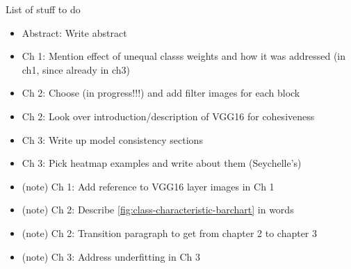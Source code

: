 
List of stuff to do

\begin{itemize}
\item Abstract: Write abstract
\item Ch 1: Mention effect of unequal classs weights and how it was addressed (in ch1, since already in ch3)
\item Ch 2: Choose (in progress!!!) and add filter images for each block
\item Ch 2: Look over introduction/description of VGG16 for cohesiveness
\item Ch 3: Write up model consistency sections
\item Ch 3: Pick heatmap examples and write about them (Seychelle's)

\item (\fix note) Ch 1: Add reference to VGG16 layer images in Ch 1
\item (\fix note) Ch 2: Describe \autoref{fig:class-characteristic-barchart} in words
\item (\fix note) Ch 2: Transition paragraph to get from chapter 2 to chapter 3
\item (\fix note) Ch 3: Address underfitting in Ch 3
\end{itemize}
